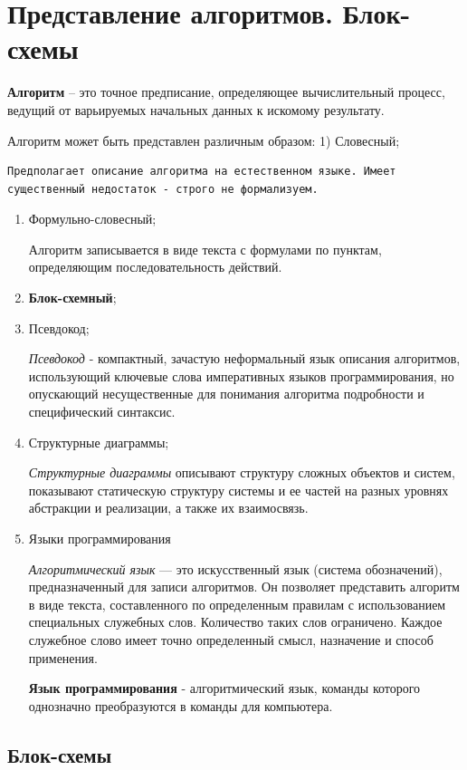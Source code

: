 \section{Представление алгоритмов. Блок-схемы}

\textbf{Алгоритм} -- это точное предписание, определяющее вычислительный
процесс, ведущий от варьируемых начальных данных к искомому результату.

Алгоритм может быть представлен различным образом: 1) Словесный;
\begin{verbatim}
Предполагает описание алгоритма на естественном языке. Имеет существенный недостаток - строго не формализуем.
\end{verbatim}

\begin{enumerate}
\item
  Формульно-словесный;

  Алгоритм записывается в виде текста с формулами по пунктам,
  определяющим последовательность действий.
\item
  \textbf{Блок-схемный};
\item
  Псевдокод;

  \emph{Псевдокод} - компактный, зачастую неформальный язык описания
  алгоритмов, использующий ключевые слова императивных языков
  программирования, но опускающий несущественные для понимания алгоритма
  подробности и специфический синтаксис.
\item
  Структурные диаграммы;

  \emph{Структурные диаграммы} описывают структуру сложных объектов и
  систем, показывают статическую структуру системы и ее частей на разных
  уровнях абстракции и реализации, а также их взаимосвязь.
\item
  Языки программирования

  \emph{Алгоритмический язык} --- это искусственный язык (система
  обозначений), предназначенный для записи алгоритмов. Он позволяет
  представить алгоритм в виде текста, составленного по определенным
  правилам с использованием специальных служебных слов. Количество таких
  слов ограничено. Каждое служебное слово имеет точно определенный
  смысл, назначение и способ применения.

  \textbf{Язык программирования} - алгоритмический язык, команды
  которого однозначно преобразуются в команды для компьютера.
\end{enumerate}

\subsection{Блок-схемы}\label{ux431ux43bux43eux43a-ux441ux445ux435ux43cux44b}

